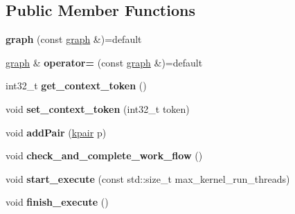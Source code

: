 \subsection*{Public Member Functions}
\begin{DoxyCompactItemize}
\item 
\mbox{\label{classral_1_1cache_1_1graph_ab6be70320b76d41744d939d4fc955b70}} 
{\bfseries graph} (const \hyperlink{classral_1_1cache_1_1graph}{graph} \&)=default
\item 
\mbox{\label{classral_1_1cache_1_1graph_a1f124c827cc8c5d50b24c40dfd3e3611}} 
\hyperlink{classral_1_1cache_1_1graph}{graph} \& {\bfseries operator=} (const \hyperlink{classral_1_1cache_1_1graph}{graph} \&)=default
\item 
\mbox{\label{classral_1_1cache_1_1graph_af5a8fe84e3617de4122139f222488260}} 
int32\+\_\+t {\bfseries get\+\_\+context\+\_\+token} ()
\item 
\mbox{\label{classral_1_1cache_1_1graph_a3554e9923c246c8a0330fdfe10ef0ceb}} 
void {\bfseries set\+\_\+context\+\_\+token} (int32\+\_\+t token)
\item 
\mbox{\label{classral_1_1cache_1_1graph_a74f4846af102d834d07c960c3891f7be}} 
void {\bfseries add\+Pair} (\hyperlink{classral_1_1cache_1_1kpair}{kpair} p)
\item 
\mbox{\label{classral_1_1cache_1_1graph_a6b91e950dd1762ea10b7a5d5721a70b3}} 
void {\bfseries check\+\_\+and\+\_\+complete\+\_\+work\+\_\+flow} ()
\item 
\mbox{\label{classral_1_1cache_1_1graph_a53b2231d465b80e88e02195d6ce0d020}} 
void {\bfseries start\+\_\+execute} (const std\+::size\+\_\+t max\+\_\+kernel\+\_\+run\+\_\+threads)
\item 
\mbox{\label{classral_1_1cache_1_1graph_aba33a58227389f24dc8f68b961c63a90}} 
void {\bfseries finish\+\_\+execute} ()
\item 
\mbox{\label{classral_1_1cache_1_1graph_a8e4d145cfcdc3a467214362c94cd90e5}} 

\end{DoxyCompactItemize}
